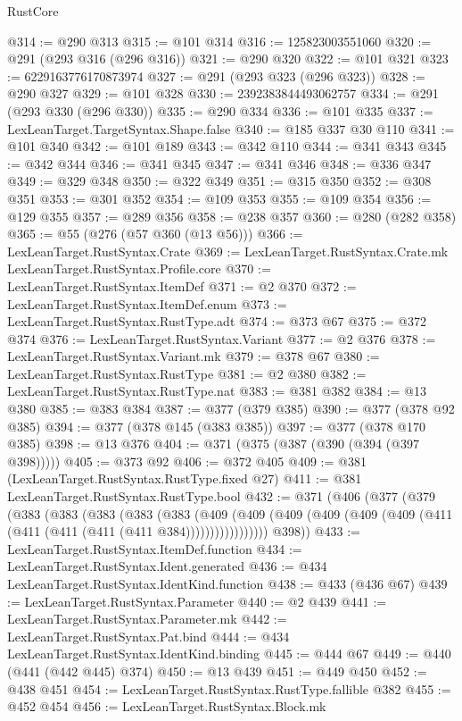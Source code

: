 \begin{lexlean}{RustCore}
\begin{coremodule}
@314 := @290 @313
@315 := @101 @314
@316 := 125823003551060
@320 := @291 (@293 @316 (@296 @316))
@321 := @290 @320
@322 := @101 @321
@323 := 6229163776170873974
@327 := @291 (@293 @323 (@296 @323))
@328 := @290 @327
@329 := @101 @328
@330 := 2392383844493062757
@334 := @291 (@293 @330 (@296 @330))
@335 := @290 @334
@336 := @101 @335
@337 := LexLeanTarget.TargetSyntax.Shape.false
@340 := @185 @337 @30 @110
@341 := @101 @340
@342 := @101 @189
@343 := @342 @110
@344 := @341 @343
@345 := @342 @344
@346 := @341 @345
@347 := @341 @346
@348 := @336 @347
@349 := @329 @348
@350 := @322 @349
@351 := @315 @350
@352 := @308 @351
@353 := @301 @352
@354 := @109 @353
@355 := @109 @354
@356 := @129 @355
@357 := @289 @356
@358 := @238 @357
@360 := @280 (@282 @358)
@365 := @55 (@276 (@57 @360 (@13 @56)))
@366 := LexLeanTarget.RustSyntax.Crate
@369 := LexLeanTarget.RustSyntax.Crate.mk LexLeanTarget.RustSyntax.Profile.core
@370 := LexLeanTarget.RustSyntax.ItemDef
@371 := @2 @370
@372 := LexLeanTarget.RustSyntax.ItemDef.enum
@373 := LexLeanTarget.RustSyntax.RustType.adt
@374 := @373 @67
@375 := @372 @374
@376 := LexLeanTarget.RustSyntax.Variant
@377 := @2 @376
@378 := LexLeanTarget.RustSyntax.Variant.mk
@379 := @378 @67
@380 := LexLeanTarget.RustSyntax.RustType
@381 := @2 @380
@382 := LexLeanTarget.RustSyntax.RustType.nat
@383 := @381 @382
@384 := @13 @380
@385 := @383 @384
@387 := @377 (@379 @385)
@390 := @377 (@378 @92 @385)
@394 := @377 (@378 @145 (@383 @385))
@397 := @377 (@378 @170 @385)
@398 := @13 @376
@404 := @371 (@375 (@387 (@390 (@394 (@397 @398)))))
@405 := @373 @92
@406 := @372 @405
@409 := @381 (LexLeanTarget.RustSyntax.RustType.fixed @27)
@411 := @381 LexLeanTarget.RustSyntax.RustType.bool
@432 := @371
    (@406
      (@377
        (@379
          (@383
            (@383
              (@383
                (@383
                  (@383
                    (@409
                      (@409
                        (@409 (@409 (@409 (@409 (@411 (@411 (@411 (@411 (@411 @384)))))))))))))))))
        @398))
@433 := LexLeanTarget.RustSyntax.ItemDef.function
@434 := LexLeanTarget.RustSyntax.Ident.generated
@436 := @434 LexLeanTarget.RustSyntax.IdentKind.function
@438 := @433 (@436 @67)
@439 := LexLeanTarget.RustSyntax.Parameter
@440 := @2 @439
@441 := LexLeanTarget.RustSyntax.Parameter.mk
@442 := LexLeanTarget.RustSyntax.Pat.bind
@444 := @434 LexLeanTarget.RustSyntax.IdentKind.binding
@445 := @444 @67
@449 := @440 (@441 (@442 @445) @374)
@450 := @13 @439
@451 := @449 @450
@452 := @438 @451
@454 := LexLeanTarget.RustSyntax.RustType.fallible @382
@455 := @452 @454
@456 := LexLeanTarget.RustSyntax.Block.mk

\end{coremodule}
\end{lexlean}
